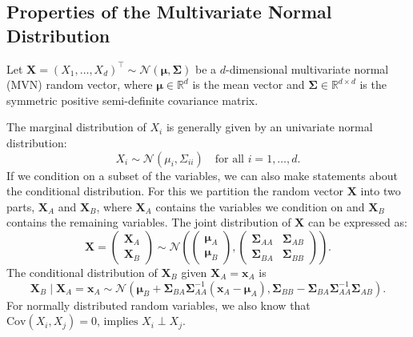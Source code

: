\subsection*{Properties of the Multivariate Normal Distribution}

Let $\boldsymbol{X} = (X_1, \dots, X_d)^\top \sim \mathcal{N}(\boldsymbol{\mu}, \boldsymbol{\Sigma})$ be a $d$-dimensional multivariate normal (MVN) random vector, where $\boldsymbol{\mu} \in \mathbb{R}^d$ is the mean vector and $\boldsymbol{\Sigma} \in \mathbb{R}^{d \times d}$ is the symmetric positive semi-definite covariance matrix.\par

The marginal distribution of $X_i$ is generally given by an univariate normal distribution:
\[
 X_i \sim \mathcal{N}(\mu_i, \Sigma_{ii}) \quad \text{for all } i = 1, \dots, d.
\]
If we condition on a subset of the variables, we can also make statements about the conditional distribution. For this we partition the random vector $\boldsymbol{X}$ into two parts, $\boldsymbol{X}_A$ and $\boldsymbol{X}_B$, where $\boldsymbol{X}_A$ contains the variables we condition on and $\boldsymbol{X}_B$ contains the remaining variables. The joint distribution of $\boldsymbol{X}$ can be expressed as:
    \[
    \boldsymbol{X} = 
    \begin{pmatrix}
    \boldsymbol{X}_A \\
    \boldsymbol{X}_B
    \end{pmatrix}
    \sim \mathcal{N}\left(
    \begin{pmatrix}
    \boldsymbol{\mu}_A \\
    \boldsymbol{\mu}_B
    \end{pmatrix},
    \begin{pmatrix}
    \boldsymbol{\Sigma}_{AA} & \boldsymbol{\Sigma}_{AB} \\
    \boldsymbol{\Sigma}_{BA} & \boldsymbol{\Sigma}_{BB}
    \end{pmatrix}
    \right).
    \]
The conditional distribution of $\boldsymbol{X}_B$ given $\boldsymbol{X}_A = \boldsymbol{x}_A$ is
    \[
    \boldsymbol{X}_B \mid \boldsymbol{X}_A = \boldsymbol{x}_A \sim 
    \mathcal{N} \left(
    \boldsymbol{\mu}_B + \boldsymbol{\Sigma}_{BA} \boldsymbol{\Sigma}_{AA}^{-1} (\boldsymbol{x}_A - \boldsymbol{\mu}_A),
    \boldsymbol{\Sigma}_{BB} - \boldsymbol{\Sigma}_{BA} \boldsymbol{\Sigma}_{AA}^{-1} \boldsymbol{\Sigma}_{AB}
    \right).
    \]
For normally distributed random variables, we also know that \(\text{Cov}(X_i, X_j) = 0 \text{, implies } X_i \perp X_j\).
